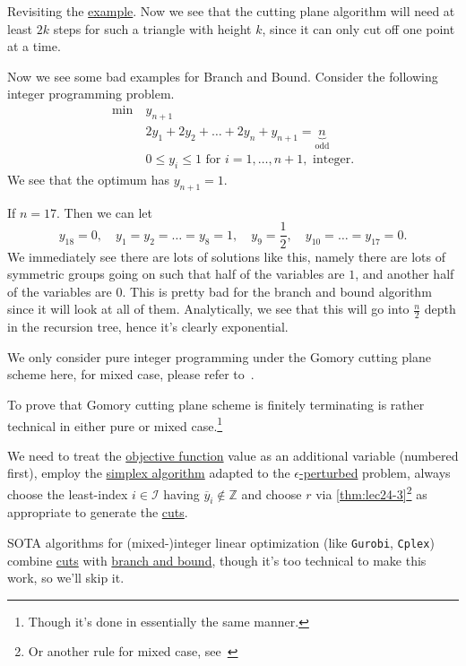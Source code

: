 Revisiting the \hyperref[eg:branch-and-bound]{example}. Now we see that the cutting plane algorithm will need at least \(2k\) steps for such a triangle with height \(k\), since it can only cut off one point at a time.

\begin{eg}
	Now we see some bad examples for Branch and Bound. Consider the following integer programming problem.
	\[
		\begin{aligned}
			\min~ & y_{n+1}                                                             \\
			      & 2y_{1} + 2y_2 + \dots +2y_n + y_{n+1} = \underbrace{n}_{\text{odd}} \\
			      & 0\leq y_{i}\leq 1 \text{ for }i = 1, \dots , n+1, \text{ integer}.
		\end{aligned}
	\]
	We see that the optimum has \(y_{n+1} = 1\).

	If \(n = 17\). Then we can let
	\[
		y_{18} = 0,\quad y_1 = y_2 = \dots = y_8 = 1,\quad y_9 = \frac{1}{2},\quad y_{10} = \dots = y_{17} = 0.
	\]
	We immediately see there are lots of solutions like this, namely there are lots of symmetric groups going on such that half of the variables are \(1\), and another half of the variables are \(0\). This is pretty bad for the branch and bound algorithm since it will look at all of them. Analytically, we see that this will go into \(\frac{n}{2}\) depth in the recursion tree, hence it's clearly exponential.
\end{eg}

\begin{remark}
	We only consider pure integer programming under the Gomory cutting plane scheme here, for mixed case, please refer to~\cite{Linear-Opt}.
\end{remark}

\begin{remark}
	To prove that Gomory cutting plane scheme is finitely terminating is rather technical in either pure or mixed case.\footnote{Though it's done in essentially the same manner.}

	We need to treat the \hyperref[def:objective-function]{objective function} value as an additional variable (numbered first), employ the \hyperref[algo:simplex-algorithm]{simplex algorithm} adapted to the \hyperref[def:perturbed-problem]{\(\epsilon \)-perturbed} problem, always choose the least-index \(i\in \mathcal{I} \) having \(\overline{y} _i \notin \mathbb{Z} \) and choose \(r\) via \autoref{thm:lec24-3}\footnote{Or another rule for mixed case, see~\cite{Linear-Opt}} as appropriate to generate the \hyperref[def:Chvatal-Gomory-cut]{cuts}.
\end{remark}

\begin{remark}
	SOTA algorithms for (mixed-)integer linear optimization (like \texttt{Gurobi}, \texttt{Cplex}) combine \hyperref[def:Chvatal-Gomory-cut]{cuts} with \hyperref[algo:branch-and-bound-algorithm]{branch and bound}, though it's too technical to make this work, so we'll skip it.
\end{remark}